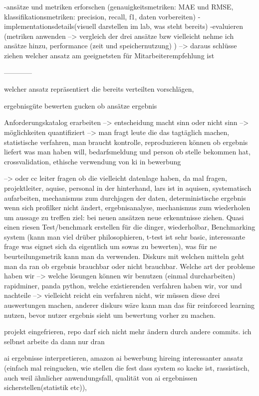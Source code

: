 \documentclass[a4paper,12pt]{scrreprt}
\begin{document}
-ansätze und metriken erforschen (genauigkeitsmetriken: MAE und RMSE, klassifikationsmetriken: precision, recall, f1, daten vorbereiten)
-implementationsdetails(visuell darstellen im lab, was steht bereits)
-evaluieren (metriken anwenden --> vergleich der drei ansätze bzw vielleicht nehme ich ansätze hinzu, performance (zeit und speichernutzung) ) --> daraus schlüsse ziehen welcher ansatz am geeignetsten für Mitarbeiterempfehlung ist


------------

welcher ansatz repräsentiert die bereits verteilten vorschlägen,

ergebnisgüte bewerten
gucken ob ansätze ergebnis

Anforderungskatalog erarbeiten --> entscheidung macht sinn oder nicht sinn
--> möglichkeiten quantifiziert --> man fragt leute die das tagtäglich machen, statistische verfahren, man braucht kontrolle, reproduzieren können ob ergebnis liefert was man haben will, bedarfsmeldung und person ob stelle bekommen hat, crossvalidation, ethische verwendung von ki in bewerbung


-->  oder cc leiter fragen ob die vielleicht datenlage haben, da mal fragen, projektleiter, aquise, personal in der hinterhand, lars ist in aquisen, systematisch aufarbeiten, mechanismus zum durchjagen der daten, deterministische ergebnis wenn sich profilker nicht ändert, ergebnisanalyse, mechanismus zum wiederholen um aussage zu treffen
ziel: bei neuen ansätzen neue erkenntnisse ziehen. Quasi einen riesen Test/benchmark erstellen für die dinger, wiederholbar, Benchmarking system (kann man viel drüber philosophieren, t-test ist sehr basic, interessante frage was eignet sich da eigentlich um sowas zu bewerten), was für ne beurteilungsmetrik kann man da verwenden. Diskurs mit welchen mitteln geht man da ran ob ergebnis brauchbar oder nicht brauchbar. Welche art der probleme haben wir --> welche lösungen können wir benutzen (einmal durcharbeiten)
rapidminer, panda python, welche existierenden verfahren haben wir, vor und nachteile --> vielleicht reicht ein verfahren nicht, wir müssen diese drei auswertungen machen, anderer diskurs wäre kann man das für reinforced learning nutzen, bevor nutzer ergebnis sieht um bewertung vorher zu machen.

projekt eingefrieren, repo darf sich nicht mehr ändern durch andere commits. ich selbnst arbeite da dann nur dran

ai ergebnisse interpretieren, amazon ai bewerbung hireing interessanter ansatz (einfach mal reingucken, wie stellen die fest dass system so kacke ist, rassistisch, auch weil ähnlicher anwendungsfall, qualität von ai ergebnissen sicherstellen(statistik etc)),
\end{document}
